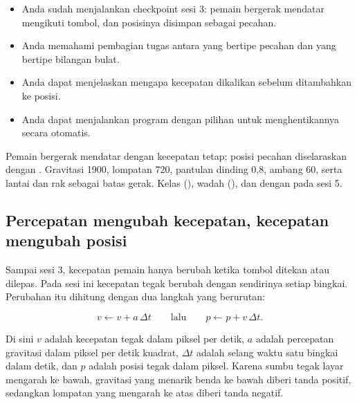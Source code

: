 
\begin{prasyaratbox}
\begin{itemize}[leftmargin=1.4em, itemsep=0.25em]
  \item Anda sudah menjalankan checkpoint sesi 3: pemain bergerak mendatar
        mengikuti tombol, dan posisinya disimpan sebagai 
        pecahan.
  \item Anda memahami pembagian tugas antara  yang bertipe
        pecahan dan  yang bertipe bilangan bulat.
  \item Anda dapat menjelaskan mengapa kecepatan dikalikan
         sebelum ditambahkan ke posisi.
  \item Anda dapat menjalankan program dengan pilihan  untuk
        menghentikannya secara otomatis.
\end{itemize}
\end{prasyaratbox}


\petasesi
  {Pemain bergerak mendatar dengan kecepatan tetap; posisi pecahan
   diselaraskan dengan .}
  {Gravitasi 1900, lompatan 720, pantulan dinding 0,8, ambang 60, serta lantai
   dan rak sebagai batas gerak.}
  {Kelas  (), wadah 
   (), dan  dengan  pada
   sesi 5.}


\subsection*{Percepatan mengubah kecepatan, kecepatan mengubah posisi}

Sampai sesi 3, kecepatan pemain hanya berubah ketika tombol ditekan atau
dilepas. Pada sesi ini kecepatan tegak berubah dengan sendirinya setiap
bingkai. Perubahan itu dihitung dengan dua langkah yang berurutan:

\[
v \leftarrow v + a\,\Delta t
\qquad\text{lalu}\qquad
p \leftarrow p + v\,\Delta t .
\]

Di sini $v$ adalah kecepatan tegak dalam piksel per detik, $a$ adalah
percepatan gravitasi dalam piksel per detik kuadrat, $\Delta t$ adalah selang
waktu satu bingkai dalam detik, dan $p$ adalah posisi tegak dalam piksel.
Karena sumbu tegak layar mengarah ke bawah, gravitasi yang menarik benda ke
bawah diberi tanda positif, sedangkan lompatan yang mengarah ke atas diberi
tanda negatif.

